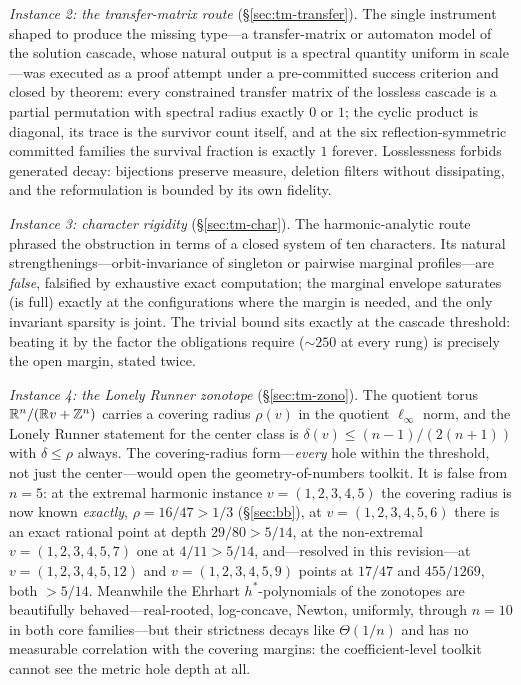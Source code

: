 \emph{Instance 2: the transfer-matrix route} (\S\ref{sec:tm-transfer}).
The single instrument shaped to produce the missing type---a
transfer-matrix or automaton model of the solution cascade, whose natural
output is a spectral quantity uniform in scale---was executed as a proof
attempt under a pre-committed success criterion and closed by theorem:
every constrained transfer matrix of the lossless cascade is a partial
permutation with spectral radius exactly $0$ or $1$; the cyclic product is
diagonal, its trace is the survivor count itself, and at the six
reflection-symmetric committed families the survival fraction is exactly
$1$ forever. Losslessness forbids generated decay: bijections preserve
measure, deletion filters without dissipating, and the reformulation is
bounded by its own fidelity.

\emph{Instance 3: character rigidity} (\S\ref{sec:tm-char}). The
harmonic-analytic route phrased the obstruction in terms of a closed
system of ten characters. Its natural strengthenings---orbit-invariance
of singleton or pairwise marginal profiles---are \emph{false}, falsified
by exhaustive exact computation; the marginal envelope saturates (is
full) exactly at the configurations where the margin is needed, and the
only invariant sparsity is joint. The trivial bound sits exactly at the
cascade threshold: beating it by the factor the obligations require
($\sim\!250$ at every rung) is precisely the open margin, stated twice.

\emph{Instance 4: the Lonely Runner zonotope}
(\S\ref{sec:tm-zono}). The quotient torus $\mathbb{R}^n/(\mathbb{R} v+\mathbb{Z}^n)$ carries a
covering radius $\rho(v)$ in the quotient $\ell_\infty$ norm, and the
Lonely Runner statement for the center class is
$\delta(v)\le (n{-}1)/(2(n{+}1))$ with $\delta\le\rho$ always. The
covering-radius form---\emph{every} hole within the threshold, not just
the center---would open the geometry-of-numbers toolkit. It is false from
$n=5$: at the extremal harmonic instance $v=(1,2,3,4,5)$ the covering
radius is now known \emph{exactly}, $\rho=16/47>1/3$
(\S\ref{sec:bb}), at $v=(1,2,3,4,5,6)$ there is an exact rational point
at depth $29/80>5/14$, at the non-extremal $v=(1,2,3,4,5,7)$ one at
$4/11>5/14$, and---resolved in this revision---at
$v=(1,2,3,4,5,12)$ and $v=(1,2,3,4,5,9)$ points at $17/47$ and
$455/1269$, both $>5/14$. Meanwhile the Ehrhart $h^*$-polynomials of the zonotopes
are beautifully behaved---real-rooted, log-concave, Newton, uniformly,
through $n=10$ in both core families---but their strictness decays like
$\Theta(1/n)$ and has no measurable correlation with the covering
margins: the coefficient-level toolkit cannot see the metric hole depth
at all.

